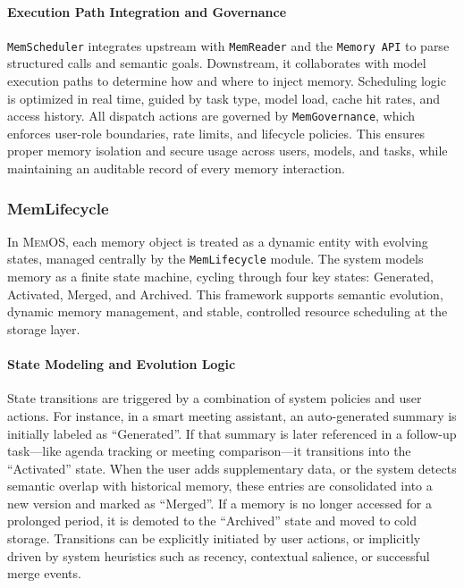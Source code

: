 \documentclass[]{memtensor}
\begin{document}
\paragraph{Execution Path Integration and Governance}  
\texttt{MemScheduler} integrates upstream with \texttt{MemReader} and the \texttt{Memory API} to parse structured calls and semantic goals.  
Downstream, it collaborates with model execution paths to determine how and where to inject memory.  
Scheduling logic is optimized in real time, guided by task type, model load, cache hit rates, and access history.  
All dispatch actions are governed by \texttt{MemGovernance}, which enforces user-role boundaries, rate limits, and lifecycle policies.  
This ensures proper memory isolation and secure usage across users, models, and tasks, while maintaining an auditable record of every memory interaction.  

\subsubsection{MemLifecycle}

In \textsc{MemOS}, each memory object is treated as a dynamic entity with evolving states, managed centrally by the \texttt{MemLifecycle} module.
The system models memory as a finite state machine, cycling through four key states: Generated, Activated, Merged, and Archived.
This framework supports semantic evolution, dynamic memory management, and stable, controlled resource scheduling at the storage layer.

\paragraph{State Modeling and Evolution Logic}  
State transitions are triggered by a combination of system policies and user actions.
For instance, in a smart meeting assistant, an auto-generated summary is initially labeled as “Generated”.
If that summary is later referenced in a follow-up task—like agenda tracking or meeting comparison—it transitions into the “Activated” state.
When the user adds supplementary data, or the system detects semantic overlap with historical memory, these entries are consolidated into a new version and marked as “Merged”.
If a memory is no longer accessed for a prolonged period, it is demoted to the “Archived” state and moved to cold storage.
Transitions can be explicitly initiated by user actions, or implicitly driven by system heuristics such as recency, contextual salience, or successful merge events.
\end{document}
